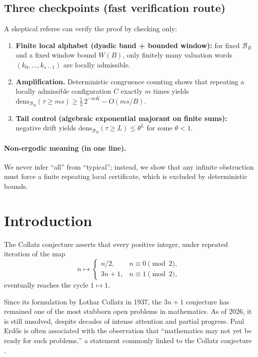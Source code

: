\documentclass[preprint,12pt]{elsarticle}
\newcommand{\densB}[2]{\mathrm{dens}_{#1}\!\left(#2\right)}
\begin{document}
\subsection*{Three checkpoints (fast verification route)}
A skeptical referee can verify the proof by checking only:
\begin{enumerate}
  \item \textbf{Finite local alphabet (dyadic band + bounded window):}
  for fixed $\mathcal{B}_B$ and a fixed window bound $W(B)$, only finitely many valuation words $(k_0,\ldots,k_{s-1})$ are locally admissible.

  \item \textbf{Amplification.}
  Deterministic congruence counting shows that repeating a locally admissible configuration $C$
  exactly $m$ times yields
  $\densB{\mathcal{B}_B}{\tau \ge ms}\ge \frac12\,2^{-mK}-O(ms/B)$.

  \item \textbf{Tail control (algebraic exponential majorant on finite sums):}
  negative drift yields $\densB{\mathcal{B}_B}{\tau \ge L}\le \theta^{L}$ for some $\theta<1$.
\end{enumerate}

\paragraph{Non-ergodic meaning (in one line).}
We never infer “all” from “typical”; instead, we show that any infinite obstruction must
force a finite repeating local certificate, which is excluded by deterministic bounds.

\section{Introduction}

The Collatz conjecture asserts that every positive integer, under repeated iteration of the map
\[
n \mapsto \begin{cases}
n/2, & n \equiv 0 \pmod{2},\\
3n+1, & n \equiv 1 \pmod{2},
\end{cases}
\]
eventually reaches the cycle \(1 \mapsto 1\).

Since its formulation by Lothar Collatz in 1937, the $3n+1$ conjecture has remained one of the most stubborn open problems in mathematics. As of 2026, it is still unsolved, despite decades of intense attention and partial progress. Paul Erd\H{o}s is often associated with the observation that ``mathematics may not yet be ready for such problems,'' a statement commonly linked to the Collatz conjecture \cite{Lagarias1985,Lagarias2010}.
\end{document}
